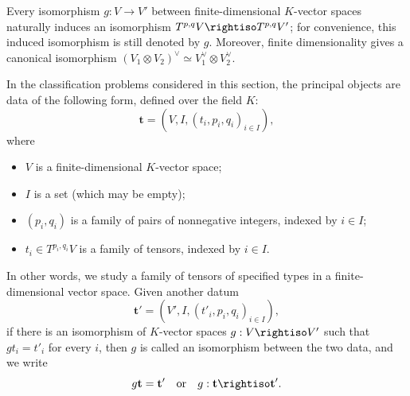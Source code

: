 Every isomorphism $g:V\to V'$ between finite-dimensional $K$-vector spaces
naturally induces an isomorphism
$T^{p,q}V\rightiso T^{p,q}V'$; for convenience, this induced isomorphism is
still denoted by $g$. Moreover, finite dimensionality gives a canonical
isomorphism
$(V_1\otimes V_2)^\vee\simeq V_1^\vee\otimes V_2^\vee$.

In the classification problems considered in this section, the principal
objects are data of the following form, defined over the field $K$:
\begin{equation}\label{eqn:tensor-data}
	\mathbf{t}=(V,I,(t_i,p_i,q_i)_{i\in I}),
\end{equation}
where
\begin{itemize}
	\item $V$ is a finite-dimensional $K$-vector space;
	\item $I$ is a set (which may be empty);
	\item $(p_i,q_i)$ is a family of pairs of nonnegative integers, indexed by
	$i\in I$;
	\item $t_i\in T^{p_i,q_i}V$ is a family of tensors, indexed by $i\in I$.
\end{itemize}

In other words, we study a family of tensors of specified types in a
finite-dimensional vector space. Given another datum
\[
\mathbf{t}'=(V',I,(t'_i,p_i,q_i)_{i\in I}),
\]
if there is an isomorphism of $K$-vector spaces $g:V\rightiso V'$ such that
$gt_i=t'_i$ for every $i$, then $g$ is called an isomorphism between the two
data, and we write
\[
g\mathbf{t}=\mathbf{t}'\quad\text{or}\quad
g:\mathbf{t}\rightiso\mathbf{t}'.
\]

